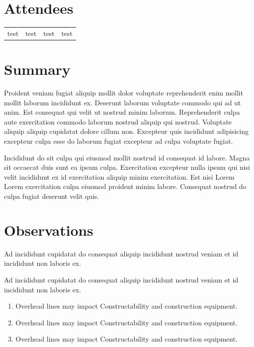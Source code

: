 \documentclass{article}
\newenvironment{pres}[2]{%
  \large{#2}
  \smallskip
}
{
  \goodbreak
  \smallskip
}
\begin{document}
\section*{Attendees}
\begin{table}[h]
  \label{tab:label}
  \begin{tabular}{l l l l}
      test & test & test & test \\
  \end{tabular}
\end{table}

\section*{Summary}

Proident veniam fugiat aliquip mollit dolor voluptate reprehenderit enim mollit
mollit laborum incididunt ex. Deserunt laborum voluptate commodo qui ad ut anim.
Est consequat qui velit ut nostrud minim laborum. Reprehenderit culpa aute
exercitation commodo laborum nostrud aliquip qui nostrud. Voluptate aliquip
aliquip cupidatat dolore cillum non. Excepteur quis incididunt adipisicing
excepteur culpa esse do laborum fugiat excepteur ad culpa voluptate fugiat.

Incididunt do sit culpa qui eiusmod mollit nostrud id consequat id labore. Magna
sit occaecat duis sunt ea ipsum culpa. Exercitation excepteur nulla ipsum qui
nisi velit incididunt ex id exercitation aliquip minim exercitation. Est nisi
Lorem Lorem exercitation culpa eiusmod proident minim labore. Consequat nostrud
do culpa fugiat deserunt velit quis.

\section*{Observations}
\begin{pres}{}{Ad incididunt cupidatat do consequat aliquip incididunt nostrud
    veniam et id incididunt non laboris ex.}

Ad incididunt cupidatat do consequat aliquip incididunt nostrud veniam et id
incididunt non laboris ex.

  \begin{enumerate}[noitemsep] \item Overhead lines may impact Constructability
      and construction equipment.  \item Overhead lines may impact
      Constructability and construction equipment.  \item Overhead lines may
      impact Constructability and construction equipment.  \end{enumerate}

\end{pres}

\newpage


\end{document}
